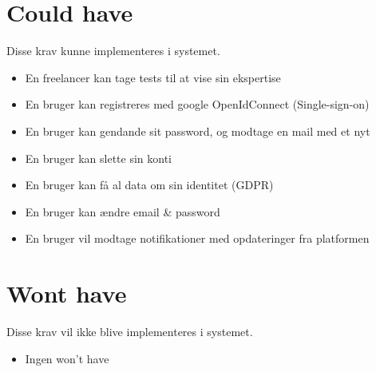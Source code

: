 \section{Could have}

Disse krav kunne implementeres i systemet.

\begin{itemize}
    \item En freelancer kan tage tests til at vise sin ekspertise
    \item En bruger kan registreres med google OpenIdConnect (Single-sign-on)
    \item En bruger kan gendande sit password, og modtage en mail med et nyt
    \item En bruger kan slette sin konti
    \item En bruger kan få al data om sin identitet (GDPR)
    \item En bruger kan ændre email \& password
    \item En bruger vil modtage notifikationer med opdateringer fra platformen
\end{itemize}

\section{Wont have}

Disse krav vil ikke blive implementeres i systemet.

\begin{itemize}
    \item Ingen won't have
\end{itemize}

